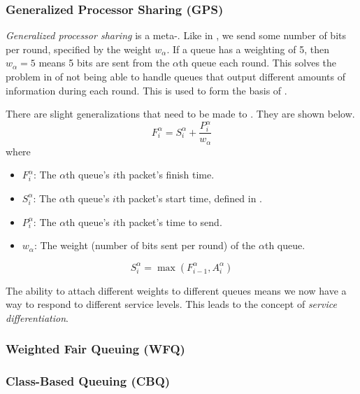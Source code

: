 \subsubsection{Generalized Processor Sharing (GPS)}\label{subsubsec:Generalized_Processor_Sharing}
\begin{definition}\label{def:Generalized_Processor_Sharing}
  \emph{Generalized processor sharing} is a  meta-.
  Like in , we send some number of bits per round, specified by the weight $w_{\alpha}$.
  If a queue has a weighting of 5, then $w_{\alpha} = 5$ means 5 bits are sent from the $\alpha$th queue each round.
  This solves the problem in  of not being able to handle queues that output different amounts of information during each round.
  This is used to form the basis of .

  There are slight generalizations that need to be made to .
  They are shown below.
  \begin{equation}\label{eq:GPS_Finish_Time}
    F_{i}^{\alpha} = S_{i}^{\alpha} + \frac{P_{i}^{\alpha}}{w_{\alpha}}
  \end{equation}
  where
  \begin{itemize}[noitemsep]
  \item $F_{i}^{\alpha}$: The $\alpha$th queue's $i$th packet's finish time.
  \item $S_{i}^{\alpha}$: The $\alpha$th queue's $i$th packet's start time, defined in .
  \item $P_{i}^{\alpha}$: The $\alpha$th queue's $i$th packet's time to send.
  \item $w_{\alpha}$: The weight (number of bits sent per round) of the $\alpha$th queue.
  \end{itemize}

  \begin{equation}\label{eq:GPS_Start_Time}
    S_{i}^{\alpha} = \max \left( F_{i-1}^{\alpha}, A_{i}^{\alpha} \right)
  \end{equation}

  \begin{remark}\label{rmk:GPS_Service_Differentiation}
    The ability to attach different weights to different queues means we now have a way to respond to different service levels.
    This leads to the concept of \emph{service differentiation}.
  \end{remark}
\end{definition}

\subsubsection{Weighted Fair Queuing (WFQ)}\label{subsubsec:Weighted_Fair_Queuing}
\subsubsection{Class-Based Queuing (CBQ)}\label{subsubsec:Class_Based_Queuing}
